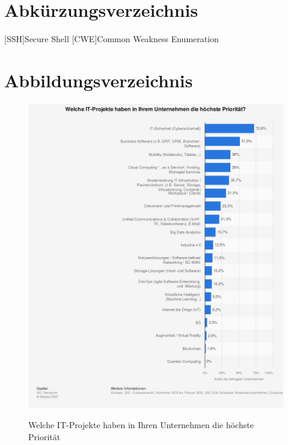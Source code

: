\chapter{Abkürzungsverzeichnis}

\begin{acronym}
	[SSH]{Secure Shell}	
	[CWE]{Common Weakness Enumeration}

\end{acronym}

\clearpage

\chapter{Abbildungsverzeichnis}


\begin{figure}[b!]
	{\caption{Welche IT-Projekte haben in Ihren Unternehmen die höchste Priorität}
		\label{FIG:statistic-it-projects}}
	{\includegraphics[width=1\textwidth]{figures/statistic-it-projekte.png}}
\end{figure}

